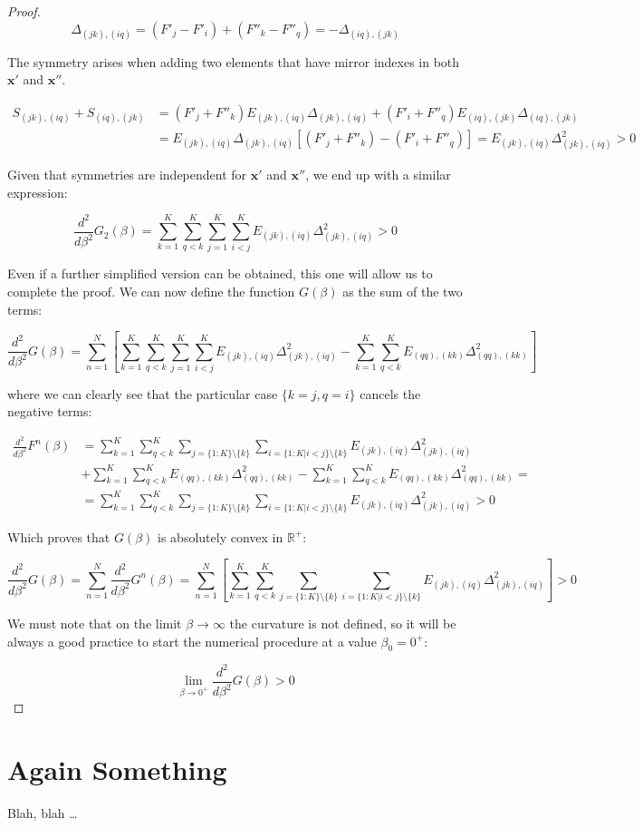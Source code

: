 \begin{proof}
$$
\Delta_{(jk),(iq)} = (F'_j - F'_i) + (F''_k - F''_q) = - \Delta_{(iq),(jk)}
$$

The symmetry arises when adding two elements that have mirror indexes in both $\bm{x}'$ and $\bm{x}''$.

$$
\begin{aligned}
S_{(jk),(iq)} + S_{(iq),(jk)} & = (F'_j + F''_k) E_{(jk),(iq)} \Delta_{(jk),(iq)} + (F'_i + F''_q) E_{(iq),(jk)} \Delta_{(iq),(jk)} \\
& = E_{(jk),(iq)} \Delta_{(jk),(iq)} [(F'_j + F''_k) - (F'_i + F''_q)] = E_{(jk),(iq)} \Delta_{(jk),(iq)}^2 > 0
\end{aligned}
$$

Given that symmetries are independent for $\bm{x}'$ and $\bm{x}''$, we end up with a similar expression:

$$
\frac{d^2}{d \beta ^2} G_2(\beta) = \sum_{k=1}^K \sum_{q<k}^K \sum_{j=1}^K \sum_{i<j}^K E_{(jk),(iq)}\Delta_{(jk),(iq)}^2 > 0
$$

Even if a further simplified version can be obtained, this one will allow us to complete the proof. We can now define the function $G(\beta)$ as the sum of the two terms:

$$
\frac{d^2}{d \beta ^2} G(\beta) = \sum_{n=1}^N \left [ \sum_{k=1}^K \sum_{q<k}^K \sum_{j=1}^K \sum_{i<j}^K E_{(jk),(iq)}\Delta_{(jk),(iq)}^2 - \sum_{k=1}^K \sum_{q<k}^K E_{(qq), (kk)}\Delta_{(qq), (kk)}^2 \right ]
$$

where we can clearly see that the particular case $\{ k=j, q=i \}$ cancels the negative terms:

$$
\begin{aligned}
    \frac{d^2}{d \beta ^2} F^n(\beta) & = \sum_{k=1}^K \sum_{q<k}^K \sum_{j = \{ 1:K \} \setminus \{ k \} } \sum_{i = \{ 1:K | i < j\} \setminus \{ k \} } E_{(jk),(iq)}\Delta_{(jk),(iq)}^2  \\ 
    & + \sum_{k=1}^K \sum_{q<k}^K E_{(qq), (kk)}\Delta_{(qq), (kk)}^2 - \sum_{k=1}^K \sum_{q<k}^K E_{(qq), (kk)}\Delta_{(qq), (kk)}^2 = \\
    & = \sum_{k=1}^K \sum_{q<k}^K \sum_{j = \{ 1:K \} \setminus \{ k \} } \sum_{i = \{ 1:K | i < j\} \setminus \{ k \} } E_{(jk),(iq)}\Delta_{(jk),(iq)}^2 > 0
\end{aligned}
$$

Which proves that $G(\beta)$ is absolutely convex in $\mathbb{R}^+$:

$$
 \frac{d^2}{d \beta ^2} G(\beta) = \sum_{n=1}^N \frac{d^2}{d \beta ^2} G^n(\beta) = \sum_{n=1}^N \left[ \sum_{k=1}^K \sum_{q<k}^K \sum_{j = \{ 1:K \} \setminus \{ k \} } \sum_{i = \{ 1:K | i < j\} \setminus \{ k \} } E_{(jk),(iq)}\Delta_{(jk),(iq)}^2 \right] > 0
$$

We must note that on the limit $\beta \to \infty$ the curvature is not defined, so it will be always a good practice to start the numerical procedure at a value $\beta_0 = 0^+$:

$$
\lim_{\beta \to 0^+} \frac{d^2}{d \beta ^2} G(\beta) > 0
$$

\end{proof}

\cleardoublepage


\chapter{Again Something}\label{sec:again_something}

Blah, blah \dots

 \cleardoublepage

